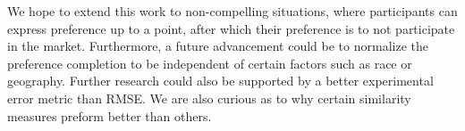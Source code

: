 We hope to extend this work to non-compelling situations, where participants can express preference up to a point, after which their preference is to not participate in the market. Furthermore, a future advancement could be to normalize the preference completion to be independent of certain factors such as race or geography. Further research could also be supported by a better experimental error metric than RMSE. We are also curious as to why certain similarity measures preform better than others.